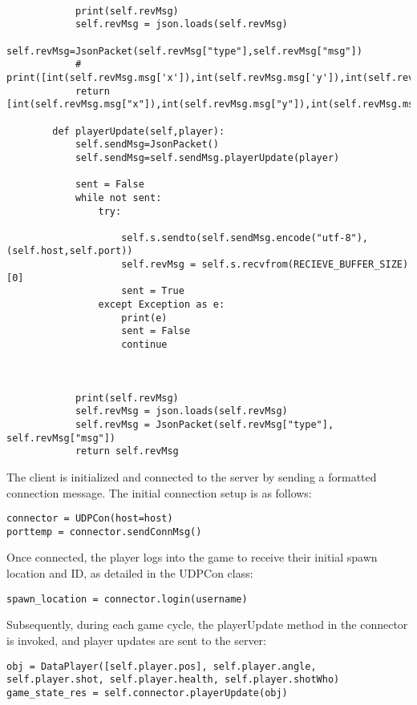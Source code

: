 \begin{lstlisting}[style=pythonstyle]
    
            print(self.revMsg)
            self.revMsg = json.loads(self.revMsg)
            self.revMsg=JsonPacket(self.revMsg["type"],self.revMsg["msg"])
            # print([int(self.revMsg.msg['x']),int(self.revMsg.msg['y']),int(self.revMsg.msg['id'])])
            return [int(self.revMsg.msg["x"]),int(self.revMsg.msg["y"]),int(self.revMsg.msg["id"])]
            
        def playerUpdate(self,player):
            self.sendMsg=JsonPacket()
            self.sendMsg=self.sendMsg.playerUpdate(player)
    
            sent = False
            while not sent:
                try:
    
                    self.s.sendto(self.sendMsg.encode("utf-8"),(self.host,self.port))
                    self.revMsg = self.s.recvfrom(RECIEVE_BUFFER_SIZE)[0]
                    sent = True
                except Exception as e:
                    print(e)
                    sent = False
                    continue
            
    
    
            print(self.revMsg)
            self.revMsg = json.loads(self.revMsg)
            self.revMsg = JsonPacket(self.revMsg["type"], self.revMsg["msg"])
            return self.revMsg
\end{lstlisting}

The client is initialized and connected to the server by sending a formatted connection message. The initial connection setup is as follows:

\begin{lstlisting}[style=pythonstyle]
connector = UDPCon(host=host)
porttemp = connector.sendConnMsg()
\end{lstlisting}

Once connected, the player logs into the game to receive their initial spawn location and ID, as detailed in the UDPCon class:

\begin{lstlisting}[style=pythonstyle]
spawn_location = connector.login(username)
\end{lstlisting}

Subsequently, during each game cycle, the playerUpdate method in the connector is invoked, and player updates are sent to the server:

\begin{lstlisting}[style=pythonstyle]
obj = DataPlayer([self.player.pos], self.player.angle, self.player.shot, self.player.health, self.player.shotWho)
game_state_res = self.connector.playerUpdate(obj)
\end{lstlisting}

